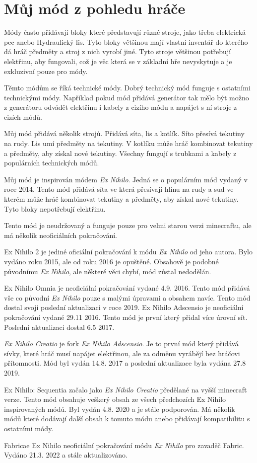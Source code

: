 \documentclass[FM,RP]{tulthesis}
\begin{document}
\chapter{Můj mód z pohledu hráče}
\par  Módy často přidávají bloky které představují různé stroje, jako třeba elektrická pec anebo Hydraulický lis. Tyto bloky většinou mají vlastní inventář do kterého dá hráč předměty a stroj z nich vyrobí jiné. Tyto stroje většinou potřebují elektřinu, aby fungovali, což je věc která se v základní hře nevyskytuje a je exkluzivní pouze pro módy.
 \par   Těmto módům se říká technické módy. Dobrý technický mód funguje s ostatními technickými módy. Například pokud mód přidává generátor tak mělo být možno z generátoru odvádět elektřinu i kabely z cizího módu a napájet s ní stroje z cizích módů. 
 \par   Můj mód přidává několik strojů. Přidává síta, lis a kotlík. Síto přesívá tekutiny na rudy. Lis umí předměty na tekutiny. V kotlíku může hráč kombinovat tekutiny a předměty, aby získal nové tekutiny.  Všechny fungují s trubkami a kabely z populárních technických módů.
\par    Můj mód je inspirován módem\textit{ Ex Nihilo}. Jedná se o populárním mód vydaný v roce 2014. Tento mód přidává síta ve která přesívají hlínu na rudy a sud ve kterém může hráč kombinovat tekutiny a předměty, aby získal nové tekutiny. Tyto bloky nepotřebují elektřinu.
 \par   Tento mód je neudržovaný a funguje pouze pro velmi starou verzi minecraftu, ale má několik neoficiálních pokračování. 
 \par       Ex Nihilo 2 je jediné oficiální pokračování k módu \textit{ Ex Nihilo} od jeho autora. Bylo vydáno roku 2015, ale od roku 2016 je opuštěné. Obsahově je podobné původnímu \textit{Ex Nihilo}, ale některé věci chybí, mód zůstal nedodělán.
 \par       Ex Nihilo Omnia je neoficiální pokračování vydané 4.9. 2016. Tento mód přidává vše co původní \textit{ Ex Nihilo} pouze s malými úpravami a obsahem navíc. Tento mód dostal svoji poslední aktualizaci v roce 2019.
Ex Nihilo Adscensio  je neoficiální pokračování vydané 29.11 2016. Tento mód je první který přidal více úrovní sít. Poslední aktualizaci dostal 6.5 2017.
\par    \textit{Ex Nihilo Creatio} je fork \textit{Ex Nihilo Adscensio}. Je to první mód který přidává sívky, které hráč musí napájet elektřinou, ale za odměnu vyrábějí bez hráčovi přítomnosti. Mód byl vydán 14.8. 2017 a poslední aktualizace byla vydána 27.8 2019.
\par    Ex Nihilo: Sequentia začalo jako  \textit{Ex Nihilo Creatio} předělané na vyšší minecraft verze. Tento mód obsahuje veškerý obsah ze všech předchozích Ex Nihilo inspirovaných módů. Byl vydán 4.8. 2020 a je stále podporován. Má několik módů které dodávají další obsah k tomuto módu anebo přidávají kompatibilitu s ostatními módy. 
\par    Fabricae Ex Nihilo neoficiální pokračování módu  \textit{Ex Nihilo} pro zavaděč Fabric. Vydáno 21.3. 2022 a stále aktualizováno.
\end{document}
